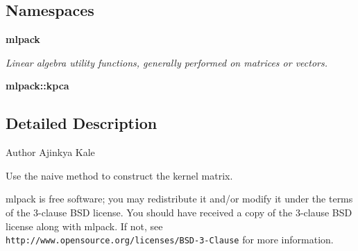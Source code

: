 \subsection*{Namespaces}
\begin{DoxyCompactItemize}
\item 
 \textbf{ mlpack}
\begin{DoxyCompactList}\small\item\em Linear algebra utility functions, generally performed on matrices or vectors. \end{DoxyCompactList}\item 
 \textbf{ mlpack\+::kpca}
\end{DoxyCompactItemize}


\subsection{Detailed Description}
\begin{DoxyAuthor}{Author}
Ajinkya Kale
\end{DoxyAuthor}
Use the naive method to construct the kernel matrix.

mlpack is free software; you may redistribute it and/or modify it under the terms of the 3-\/clause B\+SD license. You should have received a copy of the 3-\/clause B\+SD license along with mlpack. If not, see {\tt http\+://www.\+opensource.\+org/licenses/\+B\+S\+D-\/3-\/\+Clause} for more information. 